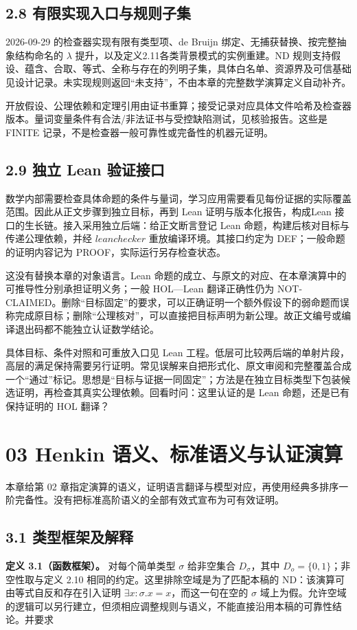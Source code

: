 \documentclass[UTF8,a4paper,zihao=-4,fontset=windows,openany]{ctexbook}
\newcommand{\mcsorigin}[1]{\par\noindent{\small\color{black!55}#1}\par\addvspace{0.8em}}
\def\mathrm#1{#1}%
\begin{document}
\section{2.8 有限实现入口与规则子集}
2026-09-29 的检查器实现有限有类型项、de Bruijn 绑定、无捕获替换、按完整抽象结构命名的 \(\lambda\) 提升，以及定义2.11各类背景模式的实例重建。ND 规则支持假设、蕴含、合取、等式、全称与存在的列明子集，具体白名单、资源界及可信基础见设计记录。未实现规则返回“未支持”，不由本章的完整数学演算定义自动补齐。

开放假设、公理依赖和定理引用由证书重算；接受记录对应具体文件哈希及检查器版本。量词变量条件有合法/非法证书与受控缺陷测试，见核验报告。这些是 FINITE 记录，不是检查器一般可靠性或完备性的机器元证明。

\section{2.9 独立 Lean 验证接口}
数学内部需要检查具体命题的条件与量词，学习应用需要看见每份证据的实际覆盖范围。因此从正文步骤到独立目标，再到 Lean 证明与版本化报告，构成Lean 接口的生长链。接入采用独立后端：给正文断言登记 Lean 命题，构建后核对目标与传递公理依赖，并经 \(\mathrm{leanchecker}\) 重放编译环境。其接口约定为 DEF；一般命题的证明内容记为 PROOF，实际运行另存检查状态。

这没有替换本章的对象语言。Lean 命题的成立、与原文的对应、在本章演算中的可推导性分别承担证明义务；一般 HOL—Lean 翻译正确性仍为 NOT-CLAIMED。删除“目标固定”的要求，可以正确证明一个额外假设下的弱命题而误称完成原目标；删除“公理核对”，可以直接把目标声明为新公理。故正文编号或编译退出码都不能独立认证数学结论。

具体目标、条件对照和可重放入口见 Lean 工程。低层可比较两后端的单射片段，高层的满足保持需要另行证明。常见误解来自把形式化、原文审阅和完整覆盖合成一个“通过”标记。思想是“目标与证据一同固定”；方法是在独立目标类型下包装候选证明，再检查其真实公理依赖。回看时问：这里认证的是 Lean 命题，还是已有保持证明的 HOL 翻译？

\clearpage\chapter{03 Henkin 语义、标准语义与认证演算}
\mcsorigin{原章节：03-语义：Henkin与标准.md}
本章给第 02 章指定演算的语义，证明语言翻译与模型对应，再使用经典多排序一阶完备性。没有把标准高阶语义的全部有效式宣布为可有效证明。

\section{3.1 类型框架及解释}
\textbf{定义 3.1（函数框架）。} 对每个简单类型 \(\sigma\) 给非空集合 \(D_\sigma\)，其中 \(D_o=\{0,1\}\)；非空性取与定义 2.10 相同的约定。这里排除空域是为了匹配本稿的 ND：该演算可由等式自反和存在引入证明 \(\exists x:\sigma.x=x\)，而这一句在空的 \(\sigma\) 域上为假。允许空域的逻辑可以另行建立，但须相应调整规则与语义，不能直接沿用本稿的可靠性结论。并要求
\end{document}
